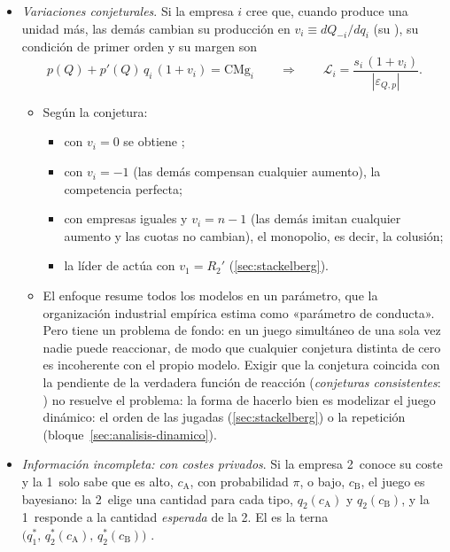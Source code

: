 \documentclass[11pt]{article}
\begin{document}
\begin{itemize}
\item \emph{Variaciones conjeturales}\nocite{Bowley1924Mathematical}. Si la empresa $i$ cree que, cuando produce una unidad más, las demás cambian su producción en $v_i\equiv dQ_{-i}/dq_i$ (su ), su condición de primer orden y su margen son
  \[
  p(Q)+p'(Q)\,q_i\,(1+v_i)=\mathrm{CMg}_i\qquad\Longrightarrow\qquad\mathcal{L}_i=\frac{s_i\,(1+v_i)}{|\varepsilon_{Q,p}|}.
  \]
  \begin{itemize}
  \item Según la conjetura:
    \begin{itemize}
    \item con $v_i=0$ se obtiene ;
    \item con $v_i=-1$ (las demás compensan cualquier aumento), la competencia perfecta;
    \item con empresas iguales y $v_i=n-1$ (las demás imitan cualquier aumento y las cuotas no cambian), el monopolio, es decir, la colusión;
    \item la líder de  actúa con $v_1=R_2'$ (\ref{sec:stackelberg}).
    \end{itemize}
  \item El enfoque resume todos los modelos en un parámetro, que la organización industrial empírica estima como «parámetro de conducta». Pero tiene un problema de fondo: en un juego simultáneo de una sola vez nadie puede reaccionar, de modo que cualquier conjetura distinta de cero es incoherente con el propio modelo\nocite{Tirole1988Theory}. Exigir que la conjetura coincida con la pendiente de la verdadera función de reacción (\emph{conjeturas consistentes}: \textcite{Bresnahan1981Duopoly}) no resuelve el problema: la forma de hacerlo bien es modelizar el juego dinámico: el orden de las jugadas (\ref{sec:stackelberg}) o la repetición (bloque~\ref{sec:analisis-dinamico}).
  \end{itemize}
\item \emph{Información incompleta:  con costes privados}. Si la empresa 2~conoce su coste y la 1~solo sabe que es alto, $c_{\mathrm A}$, con probabilidad $\pi$, o bajo, $c_{\mathrm B}$, el juego es bayesiano\nocite{Harsanyi1967Games}: la 2~elige una cantidad para cada tipo, $q_2(c_{\mathrm A})$ y $q_2(c_{\mathrm B})$, y la 1~responde a la cantidad \emph{esperada} de la 2. El  es la terna $\big(q_1^*,\,q_2^*(c_{\mathrm A}),\,q_2^*(c_{\mathrm B})\big)$\nocite{Gibbons1992Game} .

\end{itemize}
\end{document}

